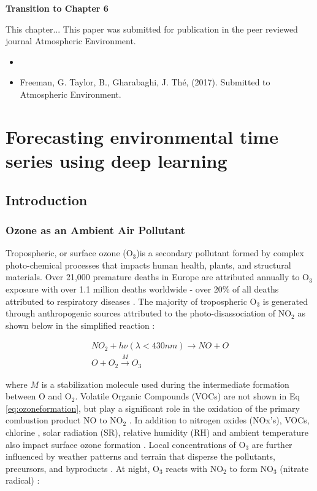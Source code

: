 \noindent \textbf{Transition to Chapter 6}

This chapter...  This paper was submitted for publication in the peer reviewed journal Atmospheric Environment.

\begin{itemize}
\item \item Freeman, G. Taylor, B., Gharabaghi, J.  Th\'e, (2017). Submitted to Atmospheric Environment.
\end{itemize}

\chapter{ Forecasting environmental time series using deep learning}

\section{Introduction}

\subsection{Ozone as an Ambient Air Pollutant}
Tropospheric, or surface ozone (O$_{3}$)is a secondary pollutant formed by complex photo-chemical processes that impacts human health, plants, and structural materials. Over 21,000 premature deaths in Europe are attributed annually to O$_{3}$ exposure \citep{WHO2008} with over 1.1 million deaths worldwide - over 20\% of all deaths attributed to respiratory diseases \citep{Malley2017}. The majority of tropospheric O$_{3}$ is generated through anthropogenic sources \citep{Lelieveld2000, Cooper2006} attributed to the photo-disassociation of NO$_{2}$ as shown below in the simplified reaction \citep{Finlayson1993}:

\begin{equation}
\label{eq:ozoneformation}
\begin{gathered}
NO_{2}+h\nu (\lambda < 430nm) \rightarrow NO+O \\
O+O_{2}\overset{M}{\rightarrow} O_{3}
\end{gathered}
\end{equation}

\noindent
where $M$ is a stabilization molecule used during the intermediate formation between O and O$_{2}$. Volatile Organic Compounds (VOCs) are not shown in Eq \ref{eq:ozoneformation}, but play a significant role in the oxidation of the primary combustion product NO to NO$_{2}$ \citep{Song2011}. In addition to nitrogen oxides (NOx's), VOCs, chlorine \citep{Thornton2010}, solar radiation (SR), relative humidity (RH) and ambient temperature also impact surface ozone formation \citep{Sadanaga2003}.  Local concentrations of O$_{3}$ are further influenced by weather patterns and terrain that disperse the pollutants, precursors, and byproducts \citep{Beck1998}. At night, O$_{3}$ reacts with NO$_{2}$ to form NO$_{3}$ (nitrate radical) \citep{Finlayson1993}:

